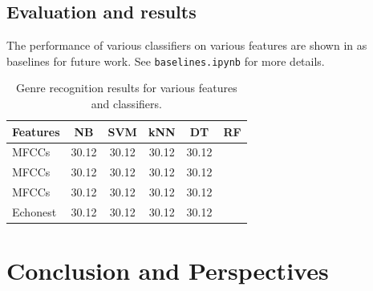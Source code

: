 \documentclass{article}
\begin{document}
\subsection{Evaluation and results}

The performance of various classifiers on various features are shown in  as baselines for future work.
See \texttt{baselines.ipynb} for more details.

\begin{table}
	\centering
	\begin{tabular}{lccccc}
		\toprule
		Features & NB & SVM & kNN & DT & RF \\
		\midrule
		MFCCs  & 30.12 & 30.12 & 30.12 & 30.12 \\
		MFCCs  & 30.12 & 30.12 & 30.12 & 30.12 \\
		MFCCs  & 30.12 & 30.12 & 30.12 & 30.12 \\
		Echonest  & 30.12 & 30.12 & 30.12 & 30.12 \\
		\bottomrule
	\end{tabular}
	\caption{Genre recognition results for various features and classifiers.}
	\label{tab:mgr}
\end{table}

%
%


\section{Conclusion and Perspectives}
\end{document}
